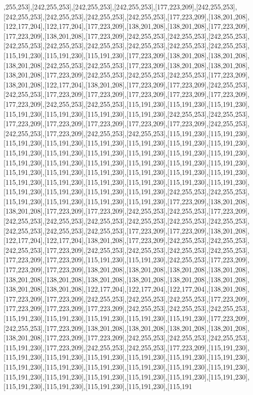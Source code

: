 ,255,253],[242,255,253],[242,255,253],[242,255,253],[177,223,209],[242,255,253],[242,255,253],[242,255,253],[242,255,253],[242,255,253],[177,223,209],[138,201,208],[122,177,204],[122,177,204],[177,223,209],[138,201,208],[138,201,208],[177,223,209],[177,223,209],[138,201,208],[177,223,209],[242,255,253],[242,255,253],[242,255,253],[242,255,253],[242,255,253],[242,255,253],[242,255,253],[242,255,253],[242,255,253],[115,191,230],[115,191,230],[115,191,230],[177,223,209],[138,201,208],[138,201,208],[138,201,208],[242,255,253],[242,255,253],[177,223,209],[138,201,208],[138,201,208],[138,201,208],[177,223,209],[242,255,253],[242,255,253],[242,255,253],[177,223,209],[138,201,208],[122,177,204],[138,201,208],[177,223,209],[177,223,209],[242,255,253],[242,255,253],[177,223,209],[177,223,209],[177,223,209],[177,223,209],[177,223,209],[177,223,209],[242,255,253],[242,255,253],[115,191,230],[115,191,230],[115,191,230],[115,191,230],[115,191,230],[115,191,230],[115,191,230],[242,255,253],[242,255,253],[177,223,209],[177,223,209],[177,223,209],[177,223,209],[177,223,209],[242,255,253],[242,255,253],[177,223,209],[242,255,253],[242,255,253],[115,191,230],[115,191,230],[115,191,230],[115,191,230],[115,191,230],[115,191,230],[115,191,230],[115,191,230],[115,191,230],[115,191,230],[115,191,230],[115,191,230],[115,191,230],[115,191,230],[115,191,230],[115,191,230],[115,191,230],[115,191,230],[115,191,230],[115,191,230],[115,191,230],[115,191,230],[115,191,230],[115,191,230],[115,191,230],[115,191,230],[115,191,230],[115,191,230],[115,191,230],[115,191,230],[115,191,230],[115,191,230],[115,191,230],[115,191,230],[115,191,230],[115,191,230],[242,255,253],[242,255,253],[115,191,230],[115,191,230],[115,191,230],[115,191,230],[177,223,209],[138,201,208],[138,201,208],[177,223,209],[177,223,209],[242,255,253],[242,255,253],[177,223,209],[242,255,253],[242,255,253],[242,255,253],[242,255,253],[242,255,253],[242,255,253],[242,255,253],[242,255,253],[242,255,253],[177,223,209],[177,223,209],[138,201,208],[122,177,204],[122,177,204],[138,201,208],[177,223,209],[242,255,253],[242,255,253],[242,255,253],[177,223,209],[242,255,253],[242,255,253],[242,255,253],[242,255,253],[177,223,209],[177,223,209],[115,191,230],[115,191,230],[242,255,253],[177,223,209],[177,223,209],[177,223,209],[138,201,208],[138,201,208],[138,201,208],[138,201,208],[138,201,208],[138,201,208],[138,201,208],[138,201,208],[138,201,208],[138,201,208],[138,201,208],[138,201,208],[122,177,204],[122,177,204],[122,177,204],[138,201,208],[177,223,209],[177,223,209],[242,255,253],[242,255,253],[242,255,253],[177,223,209],[177,223,209],[177,223,209],[177,223,209],[242,255,253],[242,255,253],[242,255,253],[115,191,230],[115,191,230],[115,191,230],[115,191,230],[115,191,230],[177,223,209],[242,255,253],[177,223,209],[138,201,208],[138,201,208],[138,201,208],[138,201,208],[138,201,208],[177,223,209],[177,223,209],[242,255,253],[242,255,253],[242,255,253],[115,191,230],[177,223,209],[242,255,253],[242,255,253],[177,223,209],[115,191,230],[115,191,230],[115,191,230],[115,191,230],[115,191,230],[115,191,230],[115,191,230],[115,191,230],[115,191,230],[115,191,230],[115,191,230],[115,191,230],[115,191,230],[115,191,230],[115,191,230],[115,191,230],[115,191,230],[115,191,230],[115,191,230],[115,191,230],[115,191,230],[115,191,230],[115,191,230],[115,191